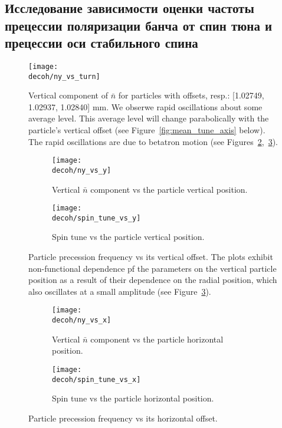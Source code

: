 \documentclass{report}
\newcommand{\Artem}{/home/alexa/REPOS/COSYINF/img/Artem}
\newcommand{\decoh}{\Artem/decoherence_frequency_dependence}
\begin{document}
\subsection{Исследование зависимости оценки частоты прецессии поляризации банча от спин тюна и прецессии оси стабильного спина}

\begin{figure}[H]
  \centering
  \texttt{[image: \\decoh/ny\_vs\_turn]}
  \caption{Vertical component of $\bar n$ for particles with offsets, resp.: [1.02749, 1.02937, 1.02840] mm. We obserwe rapid oscillations about some average level. This average level will change parabolically with the particle's vertical offset (see Figure~\ref{fig:mean_tune_axis} below). The rapid oscillations are due to betatron motion (see Figures~\ref{fig:tune_axis_position_y},~\ref{fig:tune_axis_position_x}).\label{fig:ny_vs_turn}}
\end{figure}


\begin{figure}[H]
  \centering
  \begin{subfigure}[b]{\textwidth}
    \texttt{[image: \\decoh/ny\_vs\_y]}
    \caption{Vertical $\bar n$ component vs the particle vertical position.}
  \end{subfigure}

  \begin{subfigure}[b]{\textwidth}
    \texttt{[image: \\decoh/spin\_tune\_vs\_y]}
    \caption{Spin tune vs the particle vertical position.}
  \end{subfigure}
  \caption{Particle precession frequency vs its vertical offset. The plots exhibit non-functional dependence pf the parameters on the vertical particle position as a result of their dependence on the radial position, which also oscillates at a small amplitude (see Figure~\ref{fig:tune_axis_position_x}). \label{fig:tune_axis_position_y}}
\end{figure}

\begin{figure}[H]
  \centering
  \begin{subfigure}[b]{\textwidth}
    \texttt{[image: \\decoh/ny\_vs\_x]}
    \caption{Vertical $\bar n$ component vs the particle horizontal position.}
  \end{subfigure}

  \begin{subfigure}[b]{\textwidth}
    \texttt{[image: \\decoh/spin\_tune\_vs\_x]}
    \caption{Spin tune vs the particle horizontal position.}
  \end{subfigure}
  \caption{Particle precession frequency vs its horizontal offset.\label{fig:tune_axis_position_x}}
\end{figure}
\end{document}
